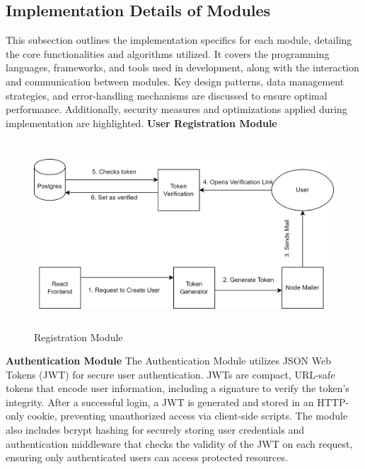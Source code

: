 \subsection{Implementation Details of Modules}
This subsection outlines the implementation specifics for each module, detailing the core functionalities and algorithms utilized. It covers the programming languages, frameworks, and tools used in development, along with the interaction and communication between modules. Key design patterns, data management strategies, and error-handling mechanisms are discussed to ensure optimal performance. Additionally, security measures and optimizations applied during implementation are highlighted.
\newline
\textbf{User Registration Module}
\begin{figure}[H]
    \centering
     \includegraphics[height = 7cm]{Diagrams/register_module.png}
     \caption{Registration Module}
 \end{figure}
\textbf{Authentication Module}
\newline
The Authentication Module utilizes JSON Web Tokens (JWT) for secure user authentication. JWTs are compact, URL-safe tokens that encode user information, including a signature to verify the token's integrity. After a successful login, a JWT is generated and stored in an HTTP-only cookie, preventing unauthorized access via client-side scripts. The module also includes bcrypt hashing for securely storing user credentials and authentication middleware that checks the validity of the JWT on each request, ensuring only authenticated users can access protected resources.
